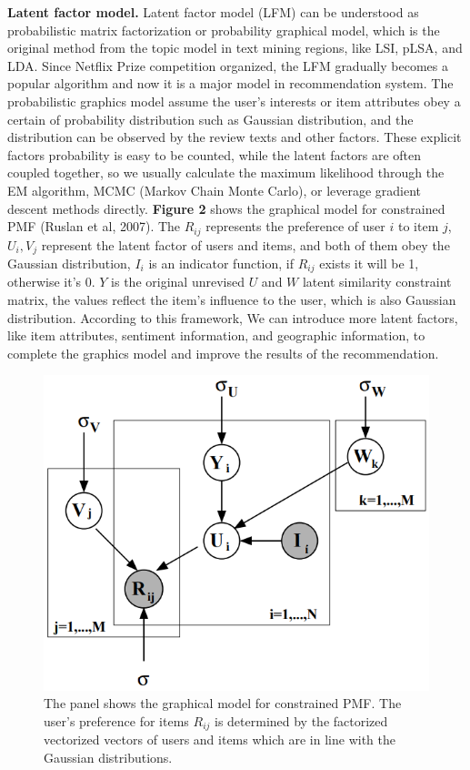 \documentclass[10pt,twocolumn,letterpaper]{article}
\begin{document}
{\bf Latent factor model.} Latent factor model (LFM) can be understood as probabilistic matrix factorization or probability graphical model, which is the original method from the topic model in text mining regions, like LSI, pLSA, and LDA. Since Netflix Prize competition organized, the LFM gradually becomes a popular algorithm and now it is a major model in recommendation system. The probabilistic graphics model assume the user's interests or item attributes obey a certain of probability distribution such as Gaussian distribution, and the distribution can be observed by the review texts and other factors. These explicit factors probability is easy to be counted, while the latent factors are often coupled together, so we usually calculate the maximum likelihood through the EM algorithm, MCMC (Markov Chain Monte Carlo), or leverage gradient descent methods directly. {\bf Figure 2} shows the graphical model for constrained PMF (Ruslan et al, 2007). The $R_{ij}$ represents the preference of user $i$ to item $j$, $U_i, V_j$ represent the latent factor of users and items, and both of them obey the Gaussian distribution, $I_i$ is an indicator function, if $R_{ij}$ exists it will be 1, otherwise it's 0. $Y$ is the original unrevised $U$ and $W$ latent similarity constraint matrix, the values reflect the item's influence to the user, which is also Gaussian distribution. According to this framework, We can introduce more latent factors, like item attributes, sentiment information, and geographic information, to complete the graphics model and improve the results of the recommendation.
\begin{figure}
	\begin{center}
		\includegraphics[width=0.8\linewidth]{gm.png}
	\end{center}
	\caption{The panel shows the graphical model for constrained PMF. The user's preference for items $R_{ij}$ is determined by the factorized vectorized vectors of users and items which are in line with the Gaussian distributions.}
	\label{fig:long}
	\label{fig:onecol}
\end{figure}
\end{document}

